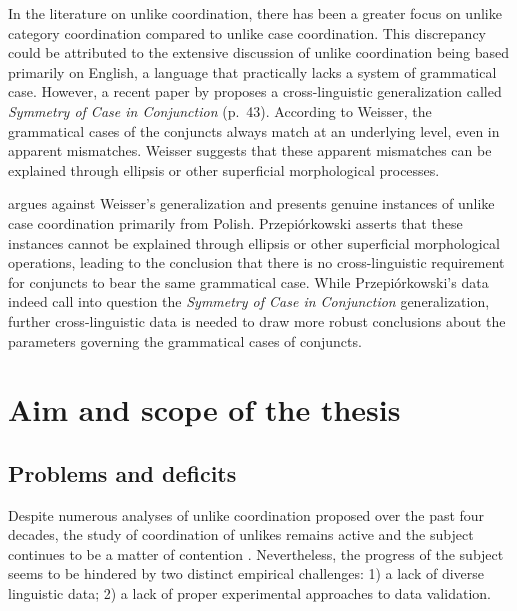 \begin{sloppypar}
In the literature on unlike coordination, there has been a greater focus on unlike category coordination compared to unlike case coordination. This discrepancy could be attributed to the extensive discussion of unlike coordination being based primarily on English, a language that practically lacks a system of grammatical case.  However, a recent paper by \citet{weisser2020} proposes a cross-linguistic generalization called \textit{Symmetry of Case in Conjunction} (p.\ 43). According to Weisser, the grammatical cases of the conjuncts always match at an underlying level, even in apparent mismatches. Weisser suggests that these apparent mismatches can be explained through ellipsis or other superficial morphological processes.

\citet{prze:22:cases} argues against Weisser's generalization and presents genuine instances of unlike case coordination primarily from Polish. Przepi\'{o}rkowski asserts that these instances cannot be explained through ellipsis or other superficial morphological operations, leading to the conclusion that there is no cross-linguistic requirement for conjuncts to bear the same grammatical case. While Przepi\'{o}rkowski's data indeed call into question the \textit{Symmetry of Case in Conjunction} generalization, further cross-linguistic data is needed to draw more robust conclusions about the parameters governing the grammatical cases of conjuncts.
\end{sloppypar}

\section{Aim and scope of the thesis}
\subsection{Problems and deficits}
Despite numerous analyses of unlike coordination proposed over the past four decades, the study of coordination of unlikes remains active and the subject continues to be a matter of contention \citep[p. 593]{prze:22:cases}. Nevertheless, the progress of the subject seems to be hindered by two distinct empirical challenges: 1) a lack of diverse linguistic data; 2) a lack of proper experimental approaches to data validation. 

